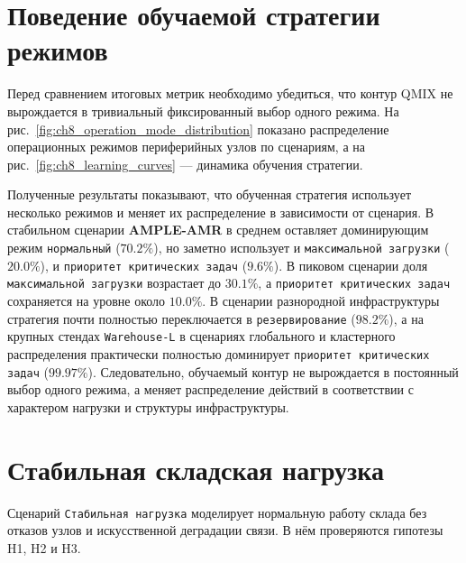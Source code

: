 \section{Поведение обучаемой стратегии режимов}

Перед сравнением итоговых метрик необходимо убедиться, что контур QMIX не вырождается в тривиальный фиксированный выбор одного режима. На рис.~\ref{fig:ch8_operation_mode_distribution} показано распределение операционных режимов периферийных узлов по сценариям, а на рис.~\ref{fig:ch8_learning_curves} --- динамика обучения стратегии.



Полученные результаты показывают, что обученная стратегия использует несколько режимов и меняет их распределение в зависимости от сценария. В стабильном сценарии \textbf{AMPLE-AMR} в среднем оставляет доминирующим режим \texttt{нормальный} ($70.2\%$), но заметно использует и \texttt{максимальной загрузки} ($20.0\%$), и \texttt{приоритет критических задач} ($9.6\%$). В пиковом сценарии доля \texttt{максимальной загрузки} возрастает до $30.1\%$, а \texttt{приоритет критических задач} сохраняется на уровне около $10.0\%$. В сценарии разнородной инфраструктуры стратегия почти полностью переключается в \texttt{резервирование} ($98.2\%$), а на крупных стендах \texttt{Warehouse-L} в сценариях глобального и кластерного распределения практически полностью доминирует \texttt{приоритет критических задач} ($99.97\%$). Следовательно, обучаемый контур не вырождается в постоянный выбор одного режима, а меняет распределение действий в соответствии с характером нагрузки и структуры инфраструктуры.

\section{Стабильная складская нагрузка}

Сценарий \texttt{Стабильная нагрузка} моделирует нормальную работу склада без отказов узлов и искусственной деградации связи. В нём проверяются гипотезы H1, H2 и H3.


